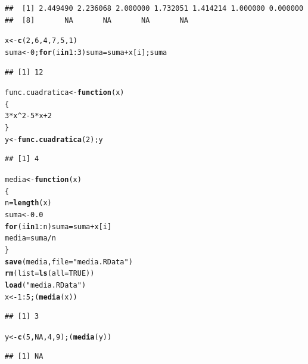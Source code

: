 \documentclass{article}\usepackage[]{graphicx}\usepackage[]{color}
\makeatletter
\newcommand{\hlnum}[1]{\textcolor[rgb]{0.686,0.059,0.569}{#1}}%
\newcommand{\hlstr}[1]{\textcolor[rgb]{0.192,0.494,0.8}{#1}}%
\newcommand{\hlopt}[1]{\textcolor[rgb]{0,0,0}{#1}}%
\newcommand{\hlstd}[1]{\textcolor[rgb]{0.345,0.345,0.345}{#1}}%
\newcommand{\hlkwa}[1]{\textcolor[rgb]{0.161,0.373,0.58}{\textbf{#1}}}%
\newcommand{\hlkwb}[1]{\textcolor[rgb]{0.69,0.353,0.396}{#1}}%
\newcommand{\hlkwc}[1]{\textcolor[rgb]{0.333,0.667,0.333}{#1}}%
\newcommand{\hlkwd}[1]{\textcolor[rgb]{0.737,0.353,0.396}{\textbf{#1}}}%
\newenvironment{kframe}{%
 \def\at@end@of@kframe{}%
 \ifinner\ifhmode%
  \def\at@end@of@kframe{\end{minipage}}%
  \begin{minipage}{\columnwidth}%
 \fi\fi%
 \def\FrameCommand##1{\hskip\@totalleftmargin \hskip-\fboxsep
 \colorbox{shadecolor}{##1}\hskip-\fboxsep
     \hskip-\linewidth \hskip-\@totalleftmargin \hskip\columnwidth}%
 \MakeFramed {\advance\hsize-\width
   \@totalleftmargin\z@ \linewidth\hsize
   \@setminipage}}%
 {\par\unskip\endMakeFramed%
 \at@end@of@kframe}
\newenvironment{knitrout}{}{} %
\makeatother
\begin{document}
\begin{knitrout}
\begin{kframe}
{\ttfamily\noindent\color{warningcolor}{\#\# Warning in sqrt(x): Se han producido NaNs}}\begin{verbatim}
##  [1] 2.449490 2.236068 2.000000 1.732051 1.414214 1.000000 0.000000
##  [8]       NA       NA       NA       NA
\end{verbatim}
\begin{alltt}
\hlstd{x} \hlkwb{<-} \hlkwd{c}\hlstd{(}\hlnum{2}\hlstd{,} \hlnum{6}\hlstd{,} \hlnum{4}\hlstd{,} \hlnum{7}\hlstd{,} \hlnum{5}\hlstd{,} \hlnum{1}\hlstd{)}
\hlstd{suma}\hlkwb{<-}\hlnum{0}\hlstd{;} \hlkwa{for}\hlstd{(i} \hlkwa{in} \hlnum{1}\hlopt{:}\hlnum{3}\hlstd{) suma} \hlkwb{=} \hlstd{suma}\hlopt{+}\hlstd{x[i]; suma}
\end{alltt}
\begin{verbatim}
## [1] 12
\end{verbatim}
\begin{alltt}
\hlstd{func.cuadratica} \hlkwb{<-} \hlkwa{function}\hlstd{(}\hlkwc{x}\hlstd{)}
\hlstd{\{}
    \hlnum{3}\hlopt{*}\hlstd{x}\hlopt{^}\hlnum{2}\hlopt{-}\hlnum{5}\hlopt{*}\hlstd{x}\hlopt{+}\hlnum{2}
\hlstd{\}}
\hlstd{y} \hlkwb{<-} \hlkwd{func.cuadratica}\hlstd{(}\hlnum{2}\hlstd{);y}
\end{alltt}
\begin{verbatim}
## [1] 4
\end{verbatim}
\begin{alltt}
\hlstd{media} \hlkwb{<-} \hlkwa{function}\hlstd{(}\hlkwc{x}\hlstd{)}
\hlstd{\{}
    \hlstd{n} \hlkwb{=} \hlkwd{length}\hlstd{(x)}
    \hlstd{suma} \hlkwb{<-} \hlnum{0.0}
    \hlkwa{for}\hlstd{(i} \hlkwa{in} \hlnum{1}\hlopt{:}\hlstd{n) suma} \hlkwb{=} \hlstd{suma} \hlopt{+} \hlstd{x[i]}
    \hlstd{media} \hlkwb{=} \hlstd{suma}\hlopt{/}\hlstd{n}
\hlstd{\}}
\hlkwd{save}\hlstd{(media,} \hlkwc{file}\hlstd{=} \hlstr{"media.RData"}\hlstd{)}
\hlkwd{rm}\hlstd{(}\hlkwc{list}\hlstd{=}\hlkwd{ls}\hlstd{(}\hlkwc{all}\hlstd{=}\hlnum{TRUE}\hlstd{))}
\hlkwd{load}\hlstd{(}\hlstr{"media.RData"}\hlstd{)}
\hlstd{x} \hlkwb{<-} \hlnum{1}\hlopt{:}\hlnum{5}\hlstd{;(}\hlkwd{media}\hlstd{(x))}
\end{alltt}
\begin{verbatim}
## [1] 3
\end{verbatim}
\begin{alltt}
\hlstd{y} \hlkwb{<-} \hlkwd{c}\hlstd{(}\hlnum{5}\hlstd{,} \hlnum{NA} \hlstd{,} \hlnum{4}\hlstd{,} \hlnum{9}\hlstd{);(}\hlkwd{media}\hlstd{(y))}
\end{alltt}
\begin{verbatim}
## [1] NA
\end{verbatim}

\end{kframe}
\end{knitrout}
\end{document}
